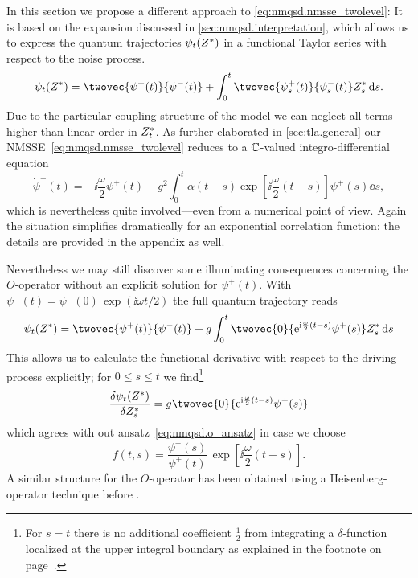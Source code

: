 In this section we propose a different approach to \autoref{eq:nmqsd.nmsse_twolevel}:
It is based on the expansion discussed in \autoref{sec:nmqsd.interpretation}, which allows us to express the quantum trajectories $\psitZ$ in a functional Taylor series with respect to the noise process.
\begin{equation*}
  \psitZ = \twovec{\psi^+(t)}{\psi^-(t)} + \int_0^t \twovec{\psi^+_s(t)}{\psi^-_s(t)} \ZZ_s \dd s.
\end{equation*}
Due to the particular coupling structure of the model we can neglect all terms higher than linear order in ${Z}^*_t$.
As further elaborated in \autoref{sec:tla.general} our NMSSE~\ref{eq:nmqsd.nmsse_twolevel} reduces to a $\mathbb{C}$-valued integro-differential equation
\begin{equation}
  \dot\psi^+(t) = -\ii \frac{\omega}{2} \psi^+(t) - g^2 \int_0^t \alpha(t - s) \exp[\ii \frac{\omega}{2} (t - s)] \psi^+(s) \dd s,
  \label{eq:nmqsd.dotpsi_plus}
\end{equation}
which is nevertheless quite involved---even from a numerical point of view.
Again the situation simplifies dramatically for an exponential correlation function; the details are provided in the appendix as well.

Nevertheless we may still discover some illuminating consequences concerning the $O$-operator without an explicit solution for $\psi^+(t)$.
With $\psi^-(t) = \psi^-(0) \, \exp(\ii \omega t / 2)$ the full quantum trajectory reads
\begin{equation}
  \psi_t(\ZZ) = \twovec{\psi^+(t)}{\psi^-(t)} + g \int_0^t \twovec{0}{\exp[\ii \frac{\omega}{2} (t-s)] \psi^+(s)} \ZZ_s \dd s
  \label{eq:nmqsd.solution}
\end{equation}
This allows us to calculate the functional derivative with respect to the driving process explicitly; for $0 \le s \le t$ we find\footnote{%
  For $s = t$ there is no additional coefficient $\frac{1}{2}$ from integrating a $\delta$-function localized at the upper integral boundary as explained in the footnote on page~\pageref{fn:tla.boundaries}.
}
\begin{equation*}
  \frac{\delta \psi_t(\ZZ)}{\delta \ZZ_s} = g \twovec{0}{\exp[\ii \frac{\omega}{2} (t-s)] \psi^+(s)}
\end{equation*}
which agrees with out ansatz~\ref{eq:nmqsd.o_ansatz} in case we choose
\begin{equation}
  f(t, s) = \frac{\psi^+(s)}{\psi^+(t)} \, \exp[\ii \frac{\omega}{2}(t - s)].
  \label{eq:nmqsd.o_ansatz_psi}
\end{equation}
A similar structure for the $O$-operator has been obtained using a Heisenberg-operator technique before \cite{St01_habil}.\\

